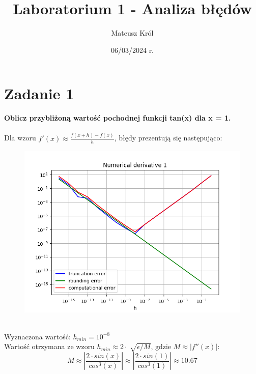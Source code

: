 \documentclass{article}
\title{Laboratorium 1 - Analiza błędów}
\author{Mateusz Król}
\date{06/03/2024 r.}
\begin{document}
\maketitle


\section*{Zadanie 1}
\textbf{Oblicz przybliżoną wartość pochodnej funkcji tan(x) dla x = 1.} 
\\\\
Dla wzoru $f'(x)\approx\frac{f(x+h)-f(x)}{h}$, błędy prezentują się następująco:
\begin{figure}[ht!]
\includegraphics[width=\linewidth]{figures/numerical_derivative_1.png}
\end{figure}
\\

Wyznaczona wartość: $h_{min} = 10^{-8}$ \\
Wartość otrzymana ze wzoru $h_{min} \approx 2\cdot\sqrt[]{\epsilon/M}$,
gdzie $M \approx \left|f''(x)\right|$: \\
$$M\approx \left|\frac{2 \cdot sin(x)}{cos^{3}(x)}\right|
\approx \left|\frac{2 \cdot sin(1)}{cos^{3}(1)}\right|
\approx 10.67$$
\end{document}

